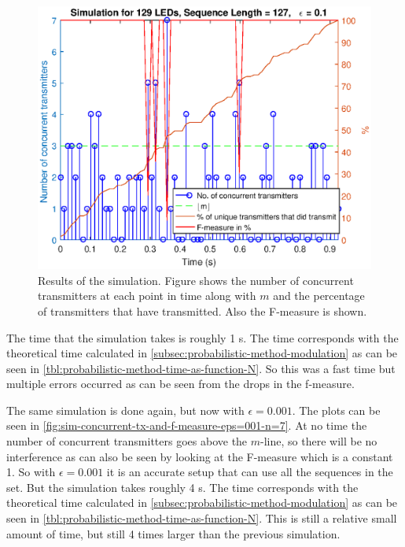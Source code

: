 \begin{figure}[tbp]
	\centering
	\includegraphics[width=\textwidth]{chapters/evaluation-chapters/simulation/sim-concurrent-tx-and-f-measure-eps=1-n=7.eps}
	\caption{Results of the simulation. Figure shows the number of concurrent transmitters at each point in time along with $m$ and the percentage of transmitters that have transmitted. Also the F-measure is shown.}
	\label{fig:sim-concurrent-tx-and-f-measure-eps=1-n=7}
\end{figure}









The time that the simulation takes is roughly 1 s.
The time corresponds with the theoretical time calculated in \autoref{subsec:probabilistic-method-modulation} as can be seen in \autoref{tbl:probabilistic-method-time-as-function-N}.
So this was a fast time but multiple errors occurred as can be seen from the drops in the f-measure.










The same simulation is done again, but now with $\epsilon = 0.001$.
The plots can be seen in \autoref{fig:sim-concurrent-tx-and-f-measure-eps=001-n=7}.
At no time the number of concurrent transmitters goes above the $m$-line, so there will be no interference as can also be seen by looking at the F-measure which is a constant 1.
So with $\epsilon = 0.001$ it is an accurate setup that can use all the sequences in the set.
But the simulation takes roughly 4 s.
The time corresponds with the theoretical time calculated in \autoref{subsec:probabilistic-method-modulation} as can be seen in \autoref{tbl:probabilistic-method-time-as-function-N}.
This is still a relative small amount of time, but still 4 times larger than the previous simulation.


